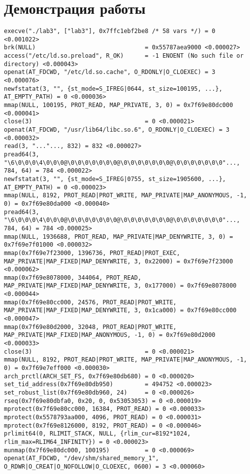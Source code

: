 \documentclass[a4paper, 12pt]{article}
\begin{document}
\section{Демонстрация работы}
\begin{lstlisting}
execve("./lab3", ["lab3"], 0x7ffc1ebf2be8 /* 58 vars */) = 0 <0.001022>
brk(NULL)                               = 0x55787aea9000 <0.000027>
access("/etc/ld.so.preload", R_OK)      = -1 ENOENT (No such file or directory) <0.000043>
openat(AT_FDCWD, "/etc/ld.so.cache", O_RDONLY|O_CLOEXEC) = 3 <0.000076>
newfstatat(3, "", {st_mode=S_IFREG|0644, st_size=100195, ...}, AT_EMPTY_PATH) = 0 <0.000036>
mmap(NULL, 100195, PROT_READ, MAP_PRIVATE, 3, 0) = 0x7f69e80dc000 <0.000041>
close(3)                                = 0 <0.000021>
openat(AT_FDCWD, "/usr/lib64/libc.so.6", O_RDONLY|O_CLOEXEC) = 3 <0.000032>
read(3, "..."..., 832) = 832 <0.000027>
pread64(3, "\6\0\0\0\4\0\0\0@\0\0\0\0\0\0\0@\0\0\0\0\0\0\0@\0\0\0\0\0\0\0"..., 784, 64) = 784 <0.000022>
newfstatat(3, "", {st_mode=S_IFREG|0755, st_size=1905600, ...}, AT_EMPTY_PATH) = 0 <0.000023>
mmap(NULL, 8192, PROT_READ|PROT_WRITE, MAP_PRIVATE|MAP_ANONYMOUS, -1, 0) = 0x7f69e80da000 <0.000040>
pread64(3, "\6\0\0\0\4\0\0\0@\0\0\0\0\0\0\0@\0\0\0\0\0\0\0@\0\0\0\0\0\0\0"..., 784, 64) = 784 <0.000025>
mmap(NULL, 1936688, PROT_READ, MAP_PRIVATE|MAP_DENYWRITE, 3, 0) = 0x7f69e7f01000 <0.000032>
mmap(0x7f69e7f23000, 1396736, PROT_READ|PROT_EXEC, MAP_PRIVATE|MAP_FIXED|MAP_DENYWRITE, 3, 0x22000) = 0x7f69e7f23000 <0.000062>
mmap(0x7f69e8078000, 344064, PROT_READ, MAP_PRIVATE|MAP_FIXED|MAP_DENYWRITE, 3, 0x177000) = 0x7f69e8078000 <0.000044>
mmap(0x7f69e80cc000, 24576, PROT_READ|PROT_WRITE, MAP_PRIVATE|MAP_FIXED|MAP_DENYWRITE, 3, 0x1ca000) = 0x7f69e80cc000 <0.000047>
mmap(0x7f69e80d2000, 32048, PROT_READ|PROT_WRITE, MAP_PRIVATE|MAP_FIXED|MAP_ANONYMOUS, -1, 0) = 0x7f69e80d2000 <0.000033>
close(3)                                = 0 <0.000021>
mmap(NULL, 8192, PROT_READ|PROT_WRITE, MAP_PRIVATE|MAP_ANONYMOUS, -1, 0) = 0x7f69e7eff000 <0.000030>
arch_prctl(ARCH_SET_FS, 0x7f69e80db680) = 0 <0.000020>
set_tid_address(0x7f69e80db950)         = 494752 <0.000023>
set_robust_list(0x7f69e80db960, 24)     = 0 <0.000026>
rseq(0x7f69e80dbfa0, 0x20, 0, 0x53053053) = 0 <0.000019>
mprotect(0x7f69e80cc000, 16384, PROT_READ) = 0 <0.000033>
mprotect(0x5578793aa000, 4096, PROT_READ) = 0 <0.000031>
mprotect(0x7f69e8126000, 8192, PROT_READ) = 0 <0.000046>
prlimit64(0, RLIMIT_STACK, NULL, {rlim_cur=8192*1024, rlim_max=RLIM64_INFINITY}) = 0 <0.000023>
munmap(0x7f69e80dc000, 100195)          = 0 <0.000069>
openat(AT_FDCWD, "/dev/shm/shared_memory_1", O_RDWR|O_CREAT|O_NOFOLLOW|O_CLOEXEC, 0600) = 3 <0.000060>

\end{lstlisting}
\end{document}
